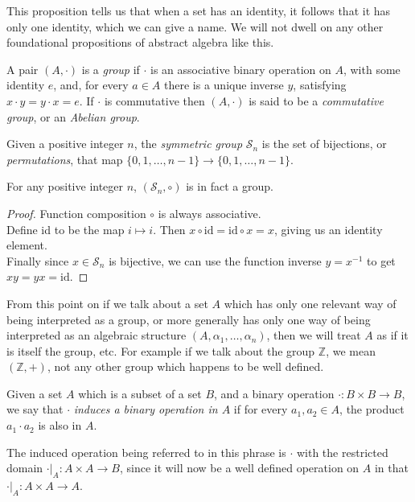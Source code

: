This proposition tells us that when a set has an identity, it follows that it has only one identity, which we can give a name. We will not dwell on any other foundational propositions of abstract algebra like this.

\begin{define}[Group] A pair $(A, \cdot)$ is a \emph{group} if $\cdot$ is an associative binary operation on $A$, with some identity $e$, and, for every $a \in A$ there is a unique inverse $y$, satisfying $x\cdot y = y \cdot x = e$. If $\cdot$ is commutative then $(A, \cdot)$ is said to be a \emph{commutative group}, or an \emph{Abelian group}.
\end{define}

\begin{define}
	Given a positive integer $n$, the \emph{symmetric group} $\mathcal{S}_n$ is the set of bijections, or \emph{permutations}, that map $\{0,1,\dots,n-1\}\to\{0,1,\dots,n-1\}$.
\end{define}
\begin{prop}
	For any positive integer $n$, $(\mathcal{S}_n, \circ)$ is in fact a group.
\end{prop}
\begin{proof}
	Function composition $\circ$ is always associative.\\
	Define id to be the map $i \mapsto i$. Then $x \circ \text{id} = \text{id} \circ x = x$, giving us an identity element.\\
	Finally since $x \in \mathcal{S}_n$ is bijective, we can use the function inverse $y = x^{-1}$ to get $xy = yx = \text{id}$.
\end{proof}

From this point on if we talk about a set $A$ which has only one relevant way of being interpreted as a group, or more generally has only one way of being interpreted as an algebraic structure $(A, \alpha_1, \dots, \alpha_n)$, then we will treat $A$ as if it is itself the group, etc. For example if we talk about the group $\mathbb{Z}$, we mean $(\mathbb{Z}, +)$, not any other group which happens to be well defined.

\begin{define} Given a set $A$ which is a subset of a set $B$, and a binary operation $\cdot: B \times B \to B$, we say that $\cdot$ \emph{induces a binary operation in $A$} if for every $a_1, a_2 \in A$, the product $a_1 \cdot a_2$ is also in $A$.
\end{define}
The induced operation being referred to in this phrase is $\cdot$ with the restricted domain $\cdot|_A: A \times A \to B$, since it will now be a well defined operation on $A$ in that $\cdot|_A: A \times A \to A$.


